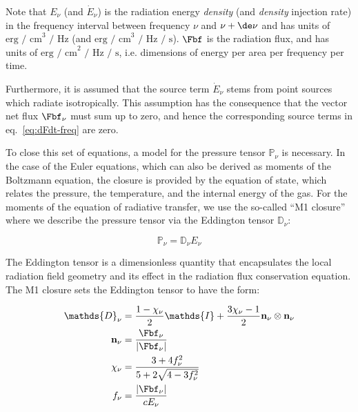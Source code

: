 Note that $E_\nu$ (and $\dot{E}_\nu$) is the radiation energy \emph{density} (and \emph{density}
injection rate) in the frequency interval between frequency $\nu$ and $\nu + \de \nu$ and has
units of $\text{erg / cm}^3 \text{ / Hz}$ (and $\text{erg / cm}^3 \text{ / Hz / s}$).
$\Fbf$ is the radiation flux, and has units of $\text{erg / cm}^2 \text{ / Hz / s}$, i.e.
dimensions of energy per area per frequency per time.

Furthermore, it is assumed that the source term $\dot{E}_\nu$ stems from point sources which radiate
isotropically. This assumption has the consequence that the vector net flux $\Fbf_\nu$ must sum up
to zero, and hence the corresponding source terms in eq.~\ref{eq:dFdt-freq} are zero.


To close this set of equations, a model for the pressure tensor $\mathds{P}_\nu$ is necessary. In
the case of the Euler equations, which can also be derived as moments of the Boltzmann equation,
the closure is provided by the equation of state, which relates the pressure, the temperature, and
the internal energy of the gas. For the moments of the equation of radiative transfer, we use the
so-called ``M1 closure'' \citep{levermoreRelatingEddingtonFactors1984} where we describe the
pressure tensor via the Eddington tensor $\mathds{D}_\nu$:

\begin{equation}
	\mathds{P}_\nu = \mathds{D}_\nu E_\nu
\end{equation}

The Eddington tensor is a dimensionless quantity that encapsulates the local radiation field
geometry and its effect in the radiation flux conservation equation. The M1 closure sets the
Eddington tensor to have the form:

\begin{align}
\mathds{D}_\nu &=
    \frac{1- \chi_\nu}{2} \mathds{I} + \frac{3 \chi_\nu - 1}{2} \mathbf{n}_\nu \otimes
    \mathbf{n}_\nu
    \label{eq:eddington-freq} \\
\mathbf{n}_\nu &=
    \frac{\Fbf_\nu}{|\Fbf_\nu|} \\
\chi_\nu &=
    \frac{3 + 4 f_\nu ^2}{5 + 2 \sqrt{4 - 3 f_\nu^2}} \\
f_\nu &=
    \frac{|\Fbf_\nu|}{c E_\nu}
\end{align}

